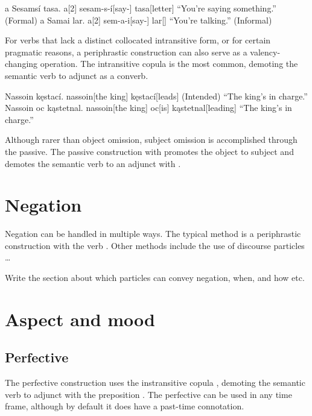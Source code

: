\begin{gloss}
	\a \begingl
		\glpreamble a Sesamsí tasa. \endpreamble
			a[2]
			sesam-s-í[say-]
			tasa[letter]
		\glft “You're saying something.”
		\trailingcitation (Formal)
	\endgl
	\a \begingl
		\glpreamble a Samai lar. \endpreamble
			a[2]
			sem-a-i[say-]
			lar[]
		\glft “You're talking.”
		\trailingcitation (Informal)
	\endgl {}
\end{gloss}

For verbs that lack a distinct collocated intransitive form, or for certain pragmatic reasons, a periphrastic construction can also serve as a valency-changing operation. The intransitive copula  is the most common, demoting the semantic verb to adjunct as a converb.

\begin{gloss}
	\a \begingl
		\glpreamble *Nassoin kęstací. \endpreamble
			nassoin[the king]
			kęstací[leads]
		\glft (Intended) “The king's in charge.”
	\endgl
	\a \begingl
		\glpreamble Nassoin oc kąstetnal. \endpreamble
			nassoin[the king]
			oc[is]
			kąstetnal[leading]
		\glft “The king's in charge.”
	\endgl {}
\end{gloss}

Although rarer than object omission, subject omission is accomplished through the  passive. The passive construction with  promotes the object to subject and demotes the semantic verb to an adjunct with .

\section{Negation}
Negation can be handled in multiple ways. The typical method is a periphrastic construction with the verb . Other methods include the use of discourse particles \dots

\begin{kaobox}[frametitle=\sc todo:]
	Write the section about which particles can convey negation, when, and how etc.
\end{kaobox}

\section{Aspect and mood}
\subsection{Perfective}
The perfective construction uses the instransitive copula , demoting the semantic verb to adjunct with the preposition . The perfective can be used in any time frame, although by default it does have a past-time connotation.

